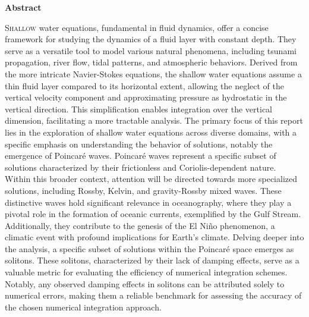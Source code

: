 \documentclass[11pt,a4paper]{report}
\begin{document}
\newpage
\tableofcontents
\newpage


\begin{center}
    \vspace*{1.5cm}\Large{\textbf{Abstract}}
    \vspace*{1cm}
    \fontsize{11}{18 }\selectfont

    \begin{minipage}{.7\linewidth}
        \lettrine[lines=4]{\color{black} S}{hallow} water equations, fundamental in fluid dynamics, offer a concise framework for studying the dynamics of a fluid layer with constant depth. They serve as a versatile tool to model various natural phenomena, including tsunami propagation, river flow, tidal patterns, and atmospheric behaviors. Derived from the more intricate Navier-Stokes equations, the shallow water equations assume a thin fluid layer compared to its horizontal extent, allowing the neglect of the vertical velocity component and approximating pressure as hydrostatic in the vertical direction. This simplification enables integration over the vertical dimension, facilitating a more tractable analysis.
        The primary focus of this report lies in the exploration of shallow water equations across diverse domains, with a specific emphasis on understanding the behavior of solutions, notably the emergence of Poincaré waves. Poincaré waves represent a specific subset of solutions characterized by their frictionless and Coriolis-dependent nature. Within this broader context, attention will be directed towards more specialized solutions, including Rossby, Kelvin, and gravity-Rossby mixed waves.
        These distinctive waves hold significant relevance in oceanography, where they play a pivotal role in the formation of oceanic currents, exemplified by the Gulf Stream. Additionally, they contribute to the genesis of the El Niño phenomenon, a climatic event with profound implications for Earth's climate. Delving deeper into the analysis, a specific subset of solutions within the Poincaré space emerges as solitons. These solitons, characterized by their lack of damping effects, serve as a valuable metric for evaluating the efficiency of numerical integration schemes. Notably, any observed damping effects in solitons can be attributed solely to numerical errors, making them a reliable benchmark for assessing the accuracy of the chosen numerical integration approach.\newpage
    \end{minipage}
\end{center}
\newpage
\fontsize{10}{10}\selectfont
\end{document}
